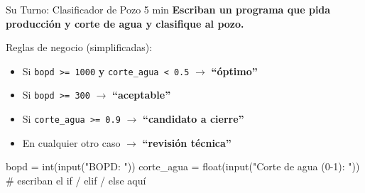 \documentclass[aspectratio=169, 11pt]{beamer}
\begin{document}
\begin{frame}[fragile]{Su Turno: Clasificador de Pozo \hfill {\normalsize\color{arcaRed}\faClock\hspace{4pt}5 min}}
  \vspace{-6pt}
  {\small\color{arcaDark}\bfseries
    Escriban un programa que pida producción y corte de agua y
    clasifique al pozo.}

  \vspace{4pt}
  {\footnotesize\color{textMuted}
  Reglas de negocio (simplificadas):}

  \vspace{2pt}
  {\footnotesize
  \begin{itemize}\setlength{\itemsep}{2pt}
    \item[{\color{arcaRed}\bfseries \(\bullet\)}]
      Si \texttt{bopd >= 1000} \textbf{y} \texttt{corte\_agua < 0.5} $\to$ \textbf{``óptimo''}
    \item[{\color{arcaRed}\bfseries \(\bullet\)}]
      Si \texttt{bopd >= 300} $\to$ \textbf{``aceptable''}
    \item[{\color{arcaRed}\bfseries \(\bullet\)}]
      Si \texttt{corte\_agua >= 0.9} $\to$ \textbf{``candidato a cierre''}
    \item[{\color{arcaRed}\bfseries \(\bullet\)}]
      En cualquier otro caso $\to$ \textbf{``revisión técnica''}
  \end{itemize}
  }

  \vspace{4pt}
  \begin{pyblock}
bopd = int(input("BOPD: "))
corte_agua = float(input("Corte de agua (0-1): "))
# escriban el if / elif / else aquí
  \end{pyblock}
\end{frame}
\end{document}
